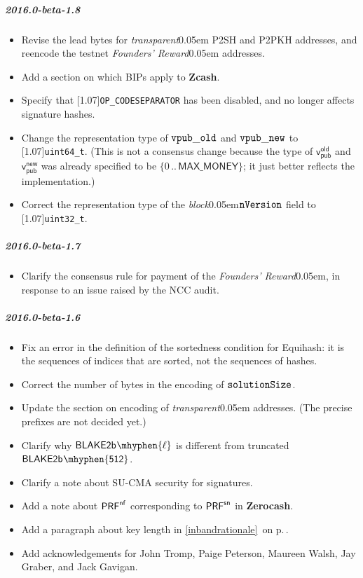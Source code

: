 \documentclass{article}
\renewcommand{\emph}[1]{\hspace{0.15em}{\fontfamily{pnc}\selectfont\scalebox{1.02}[0.999]{\textit{#1}}}\hspace{0.02em}}
\let\oldtexttt\texttt
\let\oldmathtt\mathtt
\renewcommand{\texttt}[1]{\scalebox{1.02}[1.07]{\oldtexttt{#1}}}
\renewcommand{\mathtt}[1]{\scalebox{1.02}[1.07]{$\oldmathtt{#1}$}}
\newcommand{\crossref}[1]{\autoref{#1}\, \emph{`\nameref*{#1}\kern -0.05em'} on p.\,\pageref*{#1}}
\newcommand{\introlist}{\needspace{15ex}}
\newcommand{\term}[1]{\textsl{#1}\kern 0.05em\xspace}
\newcommand{\termbf}[1]{\textbf{#1}\xspace}
\newcommand{\Zcash}{\termbf{Zcash}}
\newcommand{\Zerocash}{\termbf{Zerocash}}
\newcommand{\block}{\term{block}}
\newcommand{\transparent}{\term{transparent}}
\newcommand{\Blake}[1]{\mathsf{BLAKE2b\kern 0.05em\mhyphen{#1}}}
\newcommand{\range}[2]{\{{#1}\,..\,{#2}\}}
\newcommand{\PRF}[2]{\mathsf{{PRF}^{#2}_\mathnormal{#1}}}
\newcommand{\PRFnf}[1]{\PRF{#1}{\nf}}
\newcommand{\PRFsn}[1]{\PRF{#1}{sn}}
\newcommand{\nf}{\mathsf{nf}}
\newcommand{\MAXMONEY}{\mathsf{MAX\_MONEY}}
\newcommand{\foundersReward}{\term{Founders' Reward}}
\newcommand{\vpubOldField}{\mathtt{vpub\_old}}
\newcommand{\vpubNewField}{\mathtt{vpub\_new}}
\newcommand{\type}[1]{\texttt{#1}}
\newcommand{\ScriptOP}[1]{\texttt{OP\_{#1}}}
\newcommand{\nVersion}{\mathtt{nVersion}}
\newcommand{\solutionSize}{\mathtt{solutionSize}}
\newcommand{\vpubOld}{\mathsf{v_{pub}^{old}}}
\newcommand{\vpubNew}{\mathsf{v_{pub}^{new}}}
\begin{document}
\introlist
\subparagraph{2016.0-beta-1.8}

\begin{itemize}
    \item Revise the lead bytes for \transparent P2SH and P2PKH addresses,
          and reencode the testnet \foundersReward addresses.
    \item Add a section on which BIPs apply to \Zcash.
    \item Specify that \ScriptOP{CODESEPARATOR} has been disabled, and
          no longer affects signature hashes.
    \item Change the representation type of $\vpubOldField$ and $\vpubNewField$
          to \type{uint64\_t}. (This is not a consensus change because the type of
          $\vpubOld$ and $\vpubNew$ was already specified to be $\range{0}{\MAXMONEY}$;
          it just better reflects the implementation.)
    \item Correct the representation type of the \block $\nVersion$ field to
          \type{uint32\_t}.
\end{itemize}

\introlist
\subparagraph{2016.0-beta-1.7}

\begin{itemize}
    \item Clarify the consensus rule for payment of the \foundersReward, in
          response to an issue raised by the NCC audit.
\end{itemize}

\introlist
\subparagraph{2016.0-beta-1.6}

\begin{itemize}
    \item Fix an error in the definition of the sortedness condition for Equihash:
          it is the sequences of indices that are sorted, not the sequences of
          hashes.
    \item Correct the number of bytes in the encoding of $\solutionSize$.
    \item Update the section on encoding of \transparent addresses.
          (The precise prefixes are not decided yet.)
    \item Clarify why $\Blake{\ell}$ is different from truncated $\Blake{512}$.
    \item Clarify a note about SU-CMA security for signatures.
    \item Add a note about $\PRFnf{}$ corresponding to $\PRFsn{}$ in \Zerocash.
    \item Add a paragraph about key length in \crossref{inbandrationale}.
    \item Add acknowledgements for John Tromp, Paige Peterson, Maureen Walsh,
          Jay Graber, and Jack Gavigan.
\end{itemize}
\end{document}
